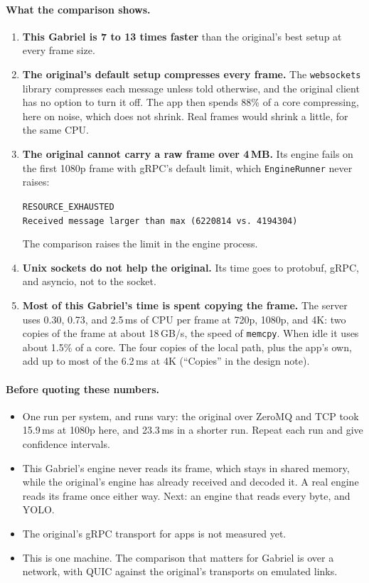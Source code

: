 \documentclass[11pt]{article}
\newcommand{\code}[1]{\texttt{#1}}
\begin{document}
\paragraph{What the comparison shows.}
\begin{enumerate}[nosep]
  \item \textbf{This Gabriel is 7 to 13 times faster} than the original's
        best setup at every frame size.
  \item \textbf{The original's default setup compresses every frame.} The
        \code{websockets} library compresses each message unless told
        otherwise, and the original client has no option to turn it off. The
        app then spends 88\% of a core compressing, here on noise, which does
        not shrink. Real frames would shrink a little, for the same CPU.
  \item \textbf{The original cannot carry a raw frame over 4\,MB.} Its engine
        fails on the first 1080p frame with gRPC's default limit, which
        \code{EngineRunner} never raises:
        \begin{center}
        \code{RESOURCE\_EXHAUSTED}\\
        \code{Received message larger than max (6220814 vs. 4194304)}
        \end{center}
        The comparison raises the limit in the engine process.
  \item \textbf{Unix sockets do not help the original.} Its time goes to
        protobuf, gRPC, and asyncio, not to the socket.
  \item \textbf{Most of this Gabriel's time is spent copying the frame.}
        The server uses 0.30, 0.73, and 2.5\,ms of CPU per frame at 720p,
        1080p, and 4K: two copies of the frame at about 18\,GB/s, the speed
        of \code{memcpy}. When idle it uses about 1.5\% of a core. The four
        copies of the local path, plus the app's own, add up to most of the
        6.2\,ms at 4K (``Copies'' in the design note).
\end{enumerate}

\paragraph{Before quoting these numbers.}
\begin{itemize}[nosep]
  \item One run per system, and runs vary: the original over ZeroMQ and TCP
        took 15.9\,ms at 1080p here, and 23.3\,ms in a shorter run. Repeat
        each run and give confidence intervals.
  \item This Gabriel's engine never reads its frame, which stays in shared
        memory, while the original's engine has already received and decoded
        it. A real engine reads its frame once either way. Next: an engine
        that reads every byte, and YOLO.
  \item The original's gRPC transport for apps is not measured yet.
  \item This is one machine. The comparison that matters for Gabriel is over
        a network, with QUIC against the original's transports on emulated
        links.
\end{itemize}
\end{document}
